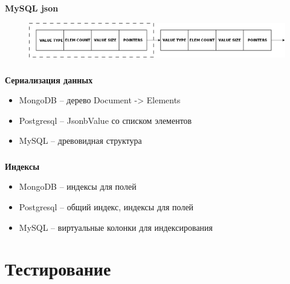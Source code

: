 \documentclass[usenames,dvipsnames, 18pt, compress, aspectratio=169]{beamer}
\begin{document}
\begin{frame}
    \frametitle{}
    \begin{center}
    \textbf{MySQL json}
    \begin{figure}
        \includegraphics[width=1.0\textwidth,center]{mysql_json.png}
    \end{figure}
    \end{center}
\end{frame}

\begin{frame}
    \frametitle{}
    \textbf{Сериализация данных}
    \begin{center}
        \begin{itemize}[label={\MVRightarrow}]
            \item MongoDB -- дерево Document -> Elements
            \item Postgresql -- JsonbValue со списком элементов
            \item MySQL -- древовидная структура
        \end{itemize}
    \end{center}
\end{frame}

\begin{frame}
    \frametitle{}
    \textbf{Индексы}
    \begin{center}
        \begin{itemize}[label={\MVRightarrow}]
            \item MongoDB -- индексы для полей
            \item Postgresql -- общий индекс, индексы для полей
            \item MySQL -- виртуальные колонки для индексирования
        \end{itemize}
    \end{center}
\end{frame}

\fontsize{13pt}{14}\selectfont
\section{Тестирование}
\fontsize{17pt}{18}\selectfont
\end{document}

